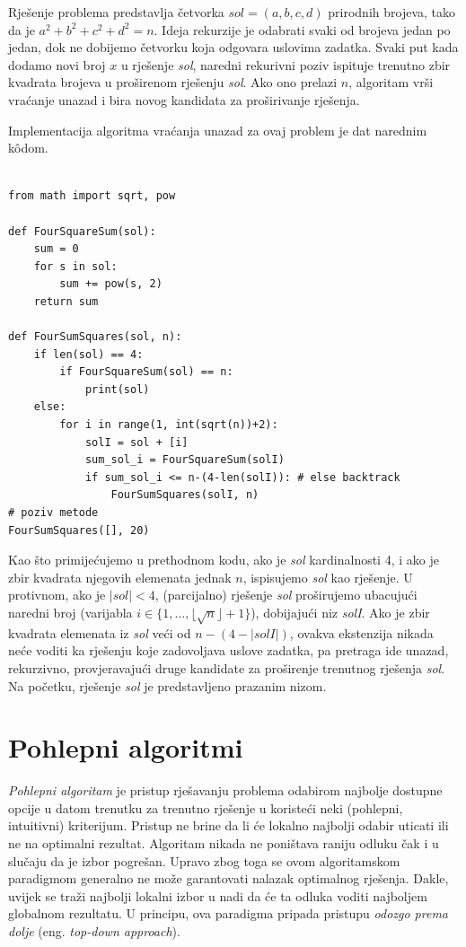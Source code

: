 \begin{solution}
	Rješenje problema predstavlja četvorka $sol = (a, b, c, d)$ prirodnih brojeva, tako da je $a^2 + b^2 + c^2 + d^2 = n$. Ideja rekurzije je odabrati svaki  od brojeva jedan po jedan, dok ne dobijemo četvorku koja odgovara uslovima zadatka. Svaki put kada dodamo novi broj $x$ u rješenje \emph{sol}, naredni rekurivni poziv ispituje trenutno zbir kvadrata brojeva u proširenom rješenju \emph{sol}. Ako ono prelazi $n$, algoritam vrši vraćanje unazad i bira novog kandidata za proširivanje rješenja. 
	
 Implementacija algoritma vraćanja unazad za ovaj problem je dat narednim k\^odom.
 
 \begin{verbatim}
 	  
from math import sqrt, pow

def FourSquareSum(sol):
	sum = 0
	for s in sol:
		sum += pow(s, 2)
	return sum

def FourSumSquares(sol, n):
	if len(sol) == 4:
		if FourSquareSum(sol) == n:
			print(sol)
	else:
		for i in range(1, int(sqrt(n))+2):
			solI = sol + [i]
			sum_sol_i = FourSquareSum(solI)
			if sum_sol_i <= n-(4-len(solI)): # else backtrack  
				FourSumSquares(solI, n) 
# poziv metode
FourSumSquares([], 20)
 \end{verbatim}
	
	Kao što primijećujemo u prethodnom kodu, ako je \emph{sol} kardinalnosti 4, i ako je zbir kvadrata njegovih elemenata jednak $n$, ispisujemo \emph{sol} kao rješenje. U protivnom, ako je $|sol|<4$, (parcijalno) rješenje \emph{sol} proširujemo ubacujući naredni broj (varijabla $i\in \{1, \ldots, \lfloor\sqrt{n} \rfloor + 1 \}$), dobijajući niz \emph{solI}.  Ako je zbir kvadrata elemenata iz \emph{sol} veći od $n-(4 - |solI|)$, ovakva ekstenzija nikada neće voditi ka rješenju koje zadovoljava uslove zadatka, pa pretraga ide unazad, rekurzivno, provjeravajući druge kandidate za proširenje trenutnog rješenja \emph{sol}. Na početku, rješenje \emph{sol} je predstavljeno prazanim nizom.
	 
\end{solution}
 
 
\section{Pohlepni algoritmi}
\textit{Pohlepni algoritam} je pristup rješavanju problema odabirom najbolje dostupne opcije u datom trenutku za trenutno rješenje u koristeći neki (pohlepni, intuitivni) kriterijum. Pristup ne brine da li će lokalno najbolji odabir uticati ili ne na optimalni rezultat. Algoritam nikada ne poništava raniju odluku čak i u slučaju da je izbor pogrešan. Upravo zbog toga se ovom algoritamskom paradigmom generalno ne može  garantovati nalazak optimalnog rješenja. Dakle, uvijek se traži najbolji lokalni izbor u nadi da će ta odluka voditi   najboljem globalnom rezultatu. U principu, ova paradigma pripada   pristupu \textit{odozgo prema dolje} (eng. \textit{top-down approach}). 

